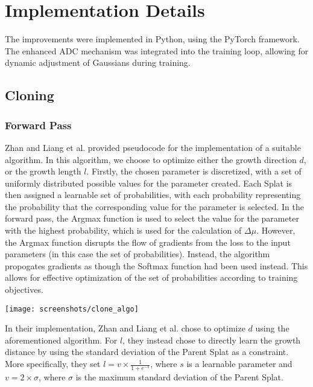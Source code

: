\documentclass[11pt]{report}
\begin{document}

\section{Implementation Details}
The improvements were implemented in Python, using the PyTorch framework. The enhanced ADC mechanism was integrated into the training loop, allowing for dynamic adjustment of Gaussians during training.

\subsection{Cloning}
\subsubsection{Forward Pass}
Zhan and Liang et al. provided pseudocode for the implementation of a suitable algorithm. In this algorithm, we choose to optimize either the growth direction $d$, or the growth length $l$. Firstly, the chosen parameter is discretized, with a set of uniformly distributed possible values for the parameter created. Each Splat is then assigned a learnable set of probabilities, with each probability representing the probability that the corresponding value for the parameter is selected. In the forward pass, the Argmax function is used to select the value for the parameter with the highest probability, which is used for the calculation of $\Delta \mu$. However, the Argmax function disrupts the flow of gradients from the loss to the input parameters (in this case the set of probabilities). Instead, the algorithm propogates gradients as though the Softmax function had been used instead. This allows for effective optimization of the set of probabilities according to training objectives.
\begin{center}
\begin{minipage}{0.6\linewidth}
\texttt{[image: screenshots/clone\_algo]}
\end{minipage}
\end{center}
In their implementation, Zhan and Liang et al. chose to optimize $d$ using the aforementioned algorithm. For $l$, they instead chose to directly learn the growth distance by using the standard deviation of the Parent Splat as a constraint. More specifically, they set $l = v \times \frac{1}{1 + e^{-s}}$, where $s$ is a learnable parameter and $v = 2 \times \sigma$, where $\sigma$ is the maximum standard deviation of the Parent Splat.
\end{document}

